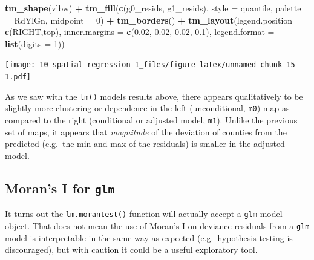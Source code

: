 \documentclass[
]{book}
\newenvironment{Shaded}{\begin{snugshade}}{\end{snugshade}}
\newcommand{\AttributeTok}[1]{\textcolor[rgb]{0.13,0.29,0.53}{#1}}
\newcommand{\DecValTok}[1]{\textcolor[rgb]{0.00,0.00,0.81}{#1}}
\newcommand{\FloatTok}[1]{\textcolor[rgb]{0.00,0.00,0.81}{#1}}
\newcommand{\FunctionTok}[1]{\textcolor[rgb]{0.13,0.29,0.53}{\textbf{#1}}}
\newcommand{\NormalTok}[1]{#1}
\newcommand{\SpecialCharTok}[1]{\textcolor[rgb]{0.81,0.36,0.00}{\textbf{#1}}}
\newcommand{\StringTok}[1]{\textcolor[rgb]{0.31,0.60,0.02}{#1}}
\begin{document}
\begin{Shaded}
\begin{Highlighting}[]
\FunctionTok{tm\_shape}\NormalTok{(vlbw) }\SpecialCharTok{+}
  \FunctionTok{tm\_fill}\NormalTok{(}\FunctionTok{c}\NormalTok{(}\StringTok{\textquotesingle{}g0\_resids\textquotesingle{}}\NormalTok{, }\StringTok{\textquotesingle{}g1\_resids\textquotesingle{}}\NormalTok{),}
          \AttributeTok{style =} \StringTok{\textquotesingle{}quantile\textquotesingle{}}\NormalTok{,}
          \AttributeTok{palette =} \StringTok{\textquotesingle{}RdYlGn\textquotesingle{}}\NormalTok{,}
          \AttributeTok{midpoint =} \DecValTok{0}\NormalTok{) }\SpecialCharTok{+}
  \FunctionTok{tm\_borders}\NormalTok{()  }\SpecialCharTok{+}
  \FunctionTok{tm\_layout}\NormalTok{(}\AttributeTok{legend.position =} \FunctionTok{c}\NormalTok{(}\StringTok{\textquotesingle{}RIGHT\textquotesingle{}}\NormalTok{,}\StringTok{\textquotesingle{}top\textquotesingle{}}\NormalTok{),}
            \AttributeTok{inner.margins =} \FunctionTok{c}\NormalTok{(}\FloatTok{0.02}\NormalTok{, }\FloatTok{0.02}\NormalTok{, }\FloatTok{0.02}\NormalTok{, }\FloatTok{0.1}\NormalTok{),}
            \AttributeTok{legend.format =} \FunctionTok{list}\NormalTok{(}\AttributeTok{digits =} \DecValTok{1}\NormalTok{))}
\end{Highlighting}
\end{Shaded}

\texttt{[image: 10-spatial-regression-1\_files/figure-latex/unnamed-chunk-15-1.pdf]}

As we saw with the \texttt{lm()} models results above, there appears qualitatively to be slightly more clustering or dependence in the left (unconditional, \texttt{m0}) map as compared to the right (conditional or adjusted model, \texttt{m1}). Unlike the previous set of maps, it appears that \emph{magnitude} of the deviation of counties from the predicted (e.g.~the min and max of the residuals) is smaller in the adjusted model.

\hypertarget{morans-i-for-glm}{%
\subsection{\texorpdfstring{Moran's I for \texttt{glm}}{Moran's I for glm}}\label{morans-i-for-glm}}

It turns out the \texttt{lm.morantest()} function will actually accept a \texttt{glm} model object. That does not mean the use of Moran's I on deviance residuals from a \texttt{glm} model is interpretable in the same way as expected (e.g.~hypothesis testing is discouraged), but with caution it could be a useful exploratory tool.
\end{document}
